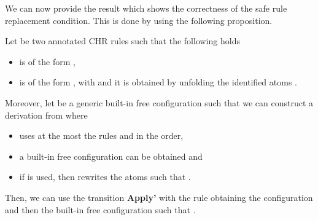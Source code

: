 \documentclass{tlp}
\begin{document}
We can now provide the result which shows the correctness of the safe rule replacement condition.
This is done by using  the following proposition.

\begin{proposition}\label{lemma:servcomplete}
Let  be two annotated CHR rules such that the following holds
\begin{itemize}
\item  is of the form ,
\item  is of the form , with
   and it is obtained by unfolding the identified atoms .
\end{itemize}
Moreover, let  be a generic built-in free configuration such that we can
construct a derivation  from  where
\begin{itemize}
  \item  uses at the most the rules  and  in the order,
  \item a built-in free configuration   can be obtained and
  \item if  is used, then  rewrites the atoms  such that . 
\end{itemize}
Then, we can use the transition \textbf{Apply'} with the rule  obtaining the configuration  and then the built-in free configuration  such that .
\end{proposition}
\end{document}
